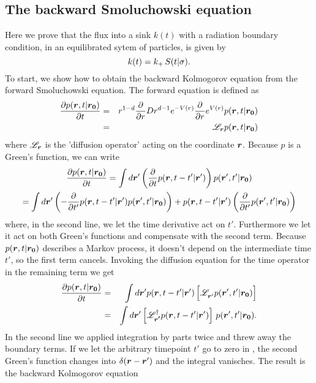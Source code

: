 \subsection{ The backward Smoluchowski equation}
Here we prove that the flux into a sink $k(t)$ with a radiation boundary condition, in an equilibrated sytem of particles, is given by
\begin{equation}
 k(t) = k_+ \, S(t|\sigma).
 \elabel{bsm_k}
\end{equation}
To start, we show how to obtain the backward Kolmogorov equation from the forward Smoluchowski equation. The forward equation is defined as
\begin{eqnarray}
 \frac{\partial p(\boldsymbol{r},t|\boldsymbol{r_0})}{\partial t} & = & r^{1-d} \frac{\partial }{\partial r} D r^{d-1} e^{-V(r)} \frac{\partial }{\partial r} e^{V(r)} p(\boldsymbol{r},t|\boldsymbol{r_0}) \\
 & = & \mathscr{L}_{\boldsymbol{r}} p(\boldsymbol{r},t|\boldsymbol{r_0})
\end{eqnarray}
where $\mathscr{L}_{\boldsymbol{r}}$ is the 'diffusion operator' acting on the coordinate $\boldsymbol{r}$. Because $p$ is a Green's function, we can write
\begin{multline}
\frac{\partial p(\boldsymbol{r},t|\boldsymbol{r_0})}{\partial t} = \int d\boldsymbol{r}' \left(\frac{\partial }{\partial t} p(\boldsymbol{r},t-t'|\boldsymbol{r}') \right) p(\boldsymbol{r}',t'|\boldsymbol{r_0}) \\
 = \int d\boldsymbol{r}' \left( - \frac{\partial }{\partial t'} p(\boldsymbol{r},t - t'|\boldsymbol{r}') p(\boldsymbol{r}',t'|\boldsymbol{r_0}) \right) + p(\boldsymbol{r},t - t'|\boldsymbol{r}') \left( \frac{\partial }{\partial t'} p(\boldsymbol{r}',t'|\boldsymbol{r_0}) \right) 
\end{multline}
where, in the second line, we let the time derivative act on $t'$. Furthermore we let it act on both Green's functions and compensate with the second term. Because $p(\boldsymbol{r},t|\boldsymbol{r_0})$ describes a Markov process, it doesn't depend on the intermediate time $t'$, so the first term cancels. Invoking the diffusion equation for the time operator in the remaining term we get
\begin{eqnarray}
 \pdiff{p(\vect{r},t|\vect{r_0})}{t} & = & \int d\vect{r}' p(\vect{r},t - t'|\vect{r}') \left[ \mathscr{L}_{\vect{r}'}^{\phantom{\dag}} p(\vect{r}',t'|\vect{r_0}) \right] \\
 & = & \int d\vect{r}' \left[ \mathscr{L}_{\vect{r'}}^{\dag} p(\vect{r},t - t'|\vect{r}') \right] \, p(\vect{r}',t'|\vect{r_0}). \elabel{bsm_1}
\end{eqnarray}
In the second line we applied integration by parts twice and threw away the boundary terms. If we let the arbitrary timepoint $t'$ go to zero in , the second Green's function changes into $\delta(\boldsymbol{r}-\boldsymbol{r}')$ and the integral vanisches. The result is the backward Kolmogorov equation
